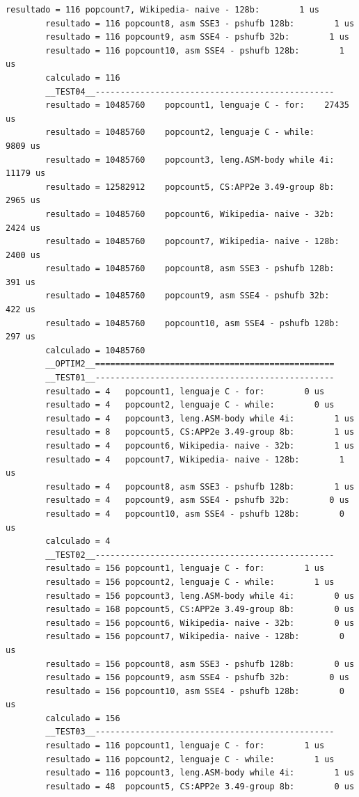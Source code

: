 \begin{lstlisting}[frame=single]
		resultado = 116	popcount7, Wikipedia- naive - 128b:        1 us
		resultado = 116	popcount8, asm SSE3 - pshufb 128b:        1 us
		resultado = 116	popcount9, asm SSE4 - pshufb 32b:        1 us
		resultado = 116	popcount10, asm SSE4 - pshufb 128b:        1 us
		calculado = 116
		__TEST04__------------------------------------------------
		resultado = 10485760	popcount1, lenguaje C - for:    27435 us
		resultado = 10485760	popcount2, lenguaje C - while:     9809 us
		resultado = 10485760	popcount3, leng.ASM-body while 4i:    11179 us
		resultado = 12582912	popcount5, CS:APP2e 3.49-group 8b:     2965 us
		resultado = 10485760	popcount6, Wikipedia- naive - 32b:     2424 us
		resultado = 10485760	popcount7, Wikipedia- naive - 128b:     2400 us
		resultado = 10485760	popcount8, asm SSE3 - pshufb 128b:      391 us
		resultado = 10485760	popcount9, asm SSE4 - pshufb 32b:      422 us
		resultado = 10485760	popcount10, asm SSE4 - pshufb 128b:      297 us
		calculado = 10485760
		__OPTIM2__================================================
		__TEST01__------------------------------------------------
		resultado = 4	popcount1, lenguaje C - for:        0 us
		resultado = 4	popcount2, lenguaje C - while:        0 us
		resultado = 4	popcount3, leng.ASM-body while 4i:        1 us
		resultado = 8	popcount5, CS:APP2e 3.49-group 8b:        1 us
		resultado = 4	popcount6, Wikipedia- naive - 32b:        1 us
		resultado = 4	popcount7, Wikipedia- naive - 128b:        1 us
		resultado = 4	popcount8, asm SSE3 - pshufb 128b:        1 us
		resultado = 4	popcount9, asm SSE4 - pshufb 32b:        0 us
		resultado = 4	popcount10, asm SSE4 - pshufb 128b:        0 us
		calculado = 4
		__TEST02__------------------------------------------------
		resultado = 156	popcount1, lenguaje C - for:        1 us
		resultado = 156	popcount2, lenguaje C - while:        1 us
		resultado = 156	popcount3, leng.ASM-body while 4i:        0 us
		resultado = 168	popcount5, CS:APP2e 3.49-group 8b:        0 us
		resultado = 156	popcount6, Wikipedia- naive - 32b:        0 us
		resultado = 156	popcount7, Wikipedia- naive - 128b:        0 us
		resultado = 156	popcount8, asm SSE3 - pshufb 128b:        0 us
		resultado = 156	popcount9, asm SSE4 - pshufb 32b:        0 us
		resultado = 156	popcount10, asm SSE4 - pshufb 128b:        0 us
		calculado = 156
		__TEST03__------------------------------------------------
		resultado = 116	popcount1, lenguaje C - for:        1 us
		resultado = 116	popcount2, lenguaje C - while:        1 us
		resultado = 116	popcount3, leng.ASM-body while 4i:        1 us
		resultado = 48	popcount5, CS:APP2e 3.49-group 8b:        0 us

\end{lstlisting}

